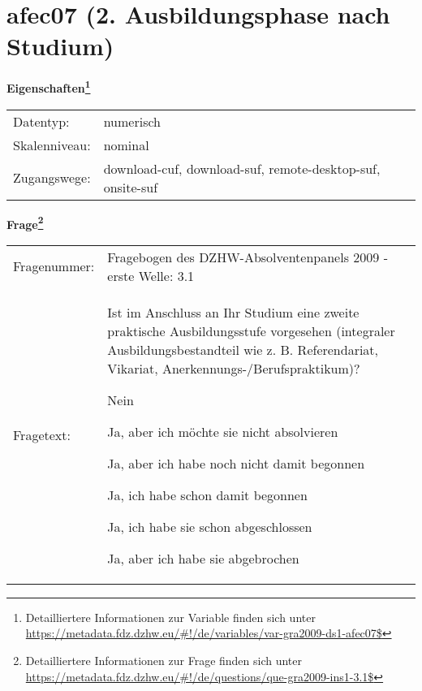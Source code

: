
    \setcounter{footnote}{0}

    \vspace*{-1.8cm}
	\section{afec07 (2. Ausbildungsphase nach Studium)}
	\label{section:afec07}



    \vspace*{0.5cm}
    \noindent\textbf{Eigenschaften\footnote{Detailliertere Informationen zur Variable finden sich unter
		\url{https://metadata.fdz.dzhw.eu/\#!/de/variables/var-gra2009-ds1-afec07$}}}\\
	\begin{tabularx}{\hsize}{@{}lX}
	Datentyp: & numerisch \\
	Skalenniveau: & nominal \\
	Zugangswege: &
	  download-cuf, 
	  download-suf, 
	  remote-desktop-suf, 
	  onsite-suf
 \\
    \end{tabularx}



				\vspace*{0.5cm}
                \noindent\textbf{Frage\footnote{Detailliertere Informationen zur Frage finden sich unter
		              \url{https://metadata.fdz.dzhw.eu/\#!/de/questions/que-gra2009-ins1-3.1$}}}\\
				\begin{tabularx}{\hsize}{@{}lX}
					Fragenummer: &
					  Fragebogen des DZHW-Absolventenpanels 2009 - erste Welle:
					  3.1
 \\
					Fragetext: & Ist im Anschluss an Ihr Studium eine zweite praktische Ausbildungsstufe vorgesehen (integraler Ausbildungsbestandteil wie z. B. Referendariat, Vikariat, Anerkennungs-/Berufspraktikum)?\par  Nein\par  Ja, aber ich möchte sie nicht absolvieren\par  Ja, aber ich habe noch nicht damit begonnen\par  Ja, ich habe schon damit begonnen\par  Ja, ich habe sie schon abgeschlossen\par  Ja, aber ich habe sie abgebrochen \\
				\end{tabularx}





